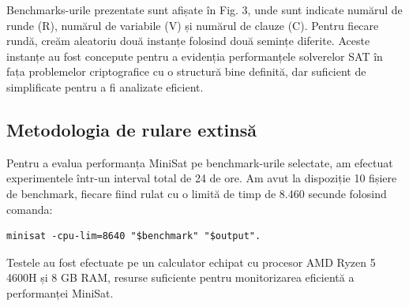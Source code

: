 \documentclass[runningheads]{llncs}
\begin{document}
Benchmarks-urile prezentate sunt afișate în Fig. 3, unde sunt indicate numărul de runde (R), numărul de variabile (V) și numărul de clauze (C). Pentru fiecare rundă, creăm aleatoriu două instanțe folosind două semințe diferite.
Aceste instanțe au fost concepute pentru a evidenția performanțele solverelor SAT în fața problemelor criptografice cu o structură bine definită, dar suficient de simplificate pentru a fi analizate eficient.

\subsection{Metodologia de rulare extinsă}

Pentru a evalua performanța MiniSat pe benchmark-urile selectate, am efectuat experimentele într-un interval total de 24 de ore. Am avut la dispoziție 10 fișiere de benchmark, fiecare fiind rulat cu o limită de timp de 8.460 secunde folosind comanda:
\begin{verbatim}
minisat -cpu-lim=8640 "$benchmark" "$output".
\end{verbatim}
Testele au fost efectuate pe un calculator echipat cu procesor AMD Ryzen 5 4600H și 8 GB RAM, resurse suficiente pentru monitorizarea eficientă a performanței MiniSat.
\end{document}
